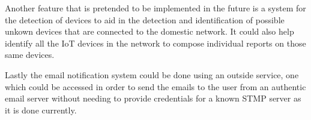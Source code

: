 Another feature that is pretended to be implemented in the future is a system
for the detection of devices to aid in the detection and identification of
possible unkown devices that are connected to the domestic network. It could
also help identify all the IoT devices in the network to compose individual
reports on those same devices.

Lastly the email notification system could be done using an outside service, one
which could be accessed in order to send the emails to the user from an
authentic email server without needing to provide credentials for a known STMP
server as it is done currently.

